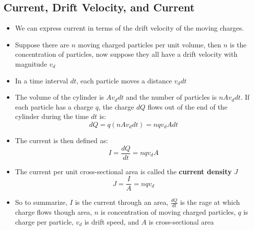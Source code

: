 \documentclass[11pt, a4paper]{article}
\begin{document}
\subsection{Current, Drift Velocity, and Current}
\begin{itemize}
    \item We can express current in terms of the drift velocity of the moving charges.
    \item Suppose there are $n$ moving charged particles per unit volume, then $n$ is the
        concentration of particles, now suppose they all have a drift velocity with
        magnitude $v_d$
    \item In a time interval $dt$, each particle moves a distance $v_d dt$
    \item The volume of the cylinder is $A v_d dt$ and the number of particles is
        $nAv_{d}dt$. If each particle has a charge $q$, the charge $dQ$ flows out of the
        end of the cylinder during the time $dt$ is:
        \begin{equation}
            dQ = q(nA v_d dt) = nq v_d A dt
        \end{equation}
    \item The current is then defined as:
        \begin{equation}
            I = \frac{dQ}{dt} = nqv_d A
        \end{equation}
    \item The current per unit cross-sectional area is called the \textbf{current
            density} $J$
        \begin{equation}
            J = \frac{I}{A} = nqv_d
        \end{equation}
    \item So to summarize, $I$ is the current through an area, $\frac{dQ}{dt}$ is the
        rage at which charge flows though area, $n$ is concentration of moving charged
        particles, $q$ is charge per particle, $v_d$ is drift speed, and $A$ is
        cross-sectional area
\end{itemize}
\end{document}
